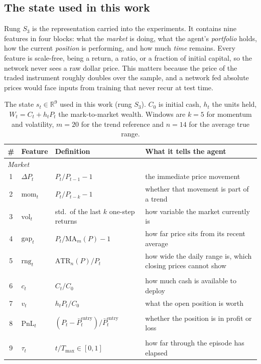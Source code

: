 \subsection{The state used in this work}
\label{sec:state_def}

Rung $S_3$ is the representation carried into the experiments. It
contains nine features in four blocks: what the \emph{market} is doing,
what the agent's \emph{portfolio} holds, how the current \emph{position}
is performing, and how much \emph{time} remains. Every feature is
scale-free, being a return, a ratio, or a fraction of initial capital, so
the network never sees a raw dollar price. This matters because the price
of the traded instrument roughly doubles over the sample, and a network
fed absolute prices would face inputs from training that never recur at
test time.

\begin{table}[h]
\centering
\caption{The state $s_t \in \mathbb{R}^9$ used in this work (rung $S_3$).
$C_0$ is initial cash, $h_t$ the units held, $W_t = C_t + h_t P_t$ the
mark-to-market wealth. Windows are $k{=}5$ for momentum and volatility,
$m{=}20$ for the trend reference and $n{=}14$ for the average true range.}
\label{tab:state}
\small
\begin{tabular}{cllp{5.1cm}}
\toprule
\# & \textbf{Feature} & \textbf{Definition} & \textbf{What it tells the agent} \\
\midrule
\multicolumn{4}{l}{\emph{Market}} \\
1 & $\Delta P_t$      & $P_t/P_{t-1} - 1$ & the immediate price movement \\
2 & $\mathrm{mom}_t$  & $P_t/P_{t-k} - 1$ & whether that movement is part of a trend \\
3 & $\mathrm{vol}_t$  & std.\ of the last $k$ one-step returns & how variable the market currently is \\
4 & $\mathrm{gap}_t$  & $P_t/\mathrm{MA}_m(P) - 1$ & how far price sits from its recent average \\
5 & $\mathrm{rng}_t$  & $\mathrm{ATR}_n(P)/P_t$ & how wide the daily range is, which closing prices cannot show \\
\addlinespace
\multicolumn{4}{l}{\emph{Portfolio}} \\
6 & $c_t$ & $C_t/C_0$ & how much cash is available to deploy \\
7 & $v_t$ & $h_t P_t/C_0$ & what the open position is worth \\
\addlinespace
\multicolumn{4}{l}{\emph{Position}} \\
8 & $\mathrm{PnL}_t$ & $(P_t - \bar{P}^{\mathrm{entry}}_t)/\bar{P}^{\mathrm{entry}}_t$ & whether the position is in profit or loss \\
\addlinespace
\multicolumn{4}{l}{\emph{Time}} \\
9 & $\tau_t$ & $t/T_{\max} \in [0,1]$ & how far through the episode has elapsed \\
\bottomrule
\end{tabular}
\end{table}

